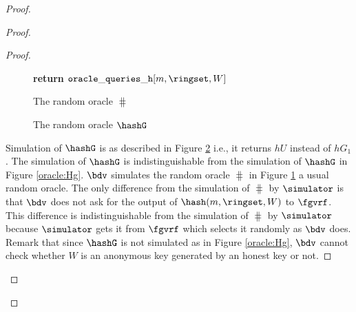 \begin{proof}
\begin{proof}
\begin{proof}
\begin{figure}
{{						
						
						
						\textbf{return $  \mathtt{oracle\_queries\_h}[m, \ringset, W] $}
						
				}}	
				\caption{The random oracle $ \hash $}
				\label{oracle:HbyB}
			\end{figure}
			
			\begin{figure}
				\centering
				
				\noindent{}	
				\caption{The random oracle $ \hashG $}
				\label{oracle:HgbyB}
			\end{figure}
			
			Simulation of $ \hashG $ is as described in Figure \ref{oracle:HgbyB} i.e., it returns $ hU $ instead of $ hG_1 $. The simulation of $ \hashG $ is indistinguishable from the simulation of $ \hashG $ in Figure \ref{oracle:Hg}. 
			$ \bdv $ simulates the random oracle $ \hash $ in Figure \ref{oracle:HbyB} a usual random oracle. The only difference from the simulation of $ \hash $ by $ \simulator $ is that $ \bdv $ does not ask for the output of $ \hash(m,\ringset,W) $ to $ \fgvrf $. This difference is indistinguishable from the simulation of $ \hash $ by $ \simulator $ because $ \simulator $ gets it from $ \fgvrf $ which selects it randomly as $ \bdv  $ does. Remark that since $ \hashG $ is not simulated as in Figure \ref{oracle:Hg}, $ \bdv $ cannot check whether $ W $ is an anonymous key generated by an honest key or not.  
			

\end{proof}
\end{proof}
\end{proof}
